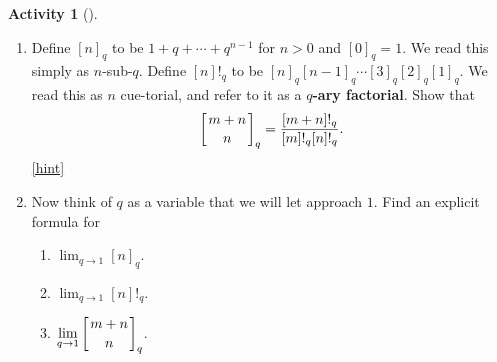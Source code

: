 \documentclass[10pt,]{book}
\newcommand{\terminology}[1]{\textbf{#1}}
\theoremstyle{plain}
\theoremstyle{definition}
\theoremstyle{definition}
\theoremstyle{definition}
\newtheorem{activity}[project]{Activity}
\numberwithin{equation}{chapter}
\newcommand{\qchoose}[2]{\left[{#1\atop#2}\right]_q}
\begin{document}
\begin{activity}[]
\begin{enumerate}[font=\bfseries,label=(\alph*),ref=\alph*]
\begin{enumerate}[font=\bfseries,label=(\roman*),ref=\theenumi.\roman*]
\item\label{task-284} \hypertarget{p-1626}{}%
The largest part of a partition counted by \(\qchoose{m+n}{n}\) is either \(m\) or is less than or equal to \(m-1\).  In the second case, the partition fits into a rectangle that is at most \(m-1\) units wide and at most \(n\) units deep.  What is the generating function for partitions of this type?  In the first case, what kind of rectangle does the partition we get by removing the largest part sit in?  What is the generating function for partitions that sit in this kind of rectangle?  What is the generating function for partitions that sit in this kind of rectangle after we remove a largest part of size \(m\)?  What recurrence relation does this give you?%
\item\label{task-285} \hypertarget{p-1630}{}%
What recurrence do you get from the other operation we studied in \hyperref[numberpartitionrecurrence]{Activity~\ref{numberpartitionrecurrence}}?%
\item\label{task-286} \hypertarget{p-1632}{}%
It is quite likely that the two recurrences you got are different.  One would expect that they might give different values for \(\qchoose{m+n}{n}\).  Can you resolve this potential conflict?%
\hfill{\tiny\hyperlink{a-327.e.iii}{[hint]}\hypertarget{q-327.e.iii}{}}\end{enumerate}
\item\label{task-287} \hypertarget{p-1635}{}%
Define \([n]_q\) to be \(1+q+\cdots+q^{n-1}\) for \(n>0\) and \([0]_q =1\).  We read this simply as \(n\)-sub-\(q\). Define \([n]!_q\) to be \([n]_q[n-1]_q\cdots [3]_q[2]_q[1]_q\). We read this as \(n\) cue-torial, and refer to it as a \terminology{\(q\)-ary factorial}. Show that%
\begin{equation*}
\qchoose{m+n}{n} = \frac{[m+n]!_q}{[m]!_q[n]!_q}.
\end{equation*}
%
\hfill{\tiny\hyperlink{a-327.f}{[hint]}\hypertarget{q-327.f}{}}\item\label{task-288} \hypertarget{p-1639}{}%
Now think of \(q\) as a variable that we will let approach \(1\). Find an explicit formula for \leavevmode%
\begin{enumerate}[label=(\roman*)]
\item\hypertarget{li-64}{}\(\displaystyle\lim_{q\rightarrow 1} [n]_q\).%
\item\hypertarget{li-65}{}\(\displaystyle\lim_{q\rightarrow 1} [n]!_q\).%
\item\hypertarget{q-binomial-lim}{}\(\displaystyle\lim_{q\rightarrow 1} \qchoose{m+n}{n}\).%

\end{enumerate}
\end{enumerate}
\end{activity}
\end{document}
